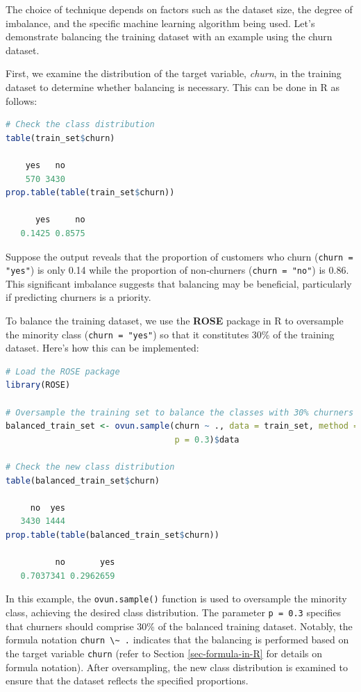 \documentclass[
]{book}
\newcommand{\passthrough}[1]{#1}
\theoremstyle{definition}
\theoremstyle{definition}
\theoremstyle{definition}
\theoremstyle{definition}
\theoremstyle{remark}
\begin{document}
The choice of technique depends on factors such as the dataset size, the degree of imbalance, and the specific machine learning algorithm being used. Let's demonstrate balancing the training dataset with an example using the churn dataset.

First, we examine the distribution of the target variable, \emph{churn}, in the training dataset to determine whether balancing is necessary. This can be done in R as follows:

\begin{lstlisting}[language=R]
# Check the class distribution
table(train_set$churn)
   
    yes   no 
    570 3430
prop.table(table(train_set$churn))
   
      yes     no 
   0.1425 0.8575
\end{lstlisting}

Suppose the output reveals that the proportion of customers who churn (\passthrough{\lstinline!churn = "yes"!}) is only 0.14 while the proportion of non-churners (\passthrough{\lstinline!churn = "no"!}) is 0.86. This significant imbalance suggests that balancing may be beneficial, particularly if predicting churners is a priority.

To balance the training dataset, we use the \textbf{ROSE} package in R to oversample the minority class (\passthrough{\lstinline!churn = "yes"!}) so that it constitutes 30\% of the training dataset. Here's how this can be implemented:

\begin{lstlisting}[language=R]
# Load the ROSE package
library(ROSE)

# Oversample the training set to balance the classes with 30% churners
balanced_train_set <- ovun.sample(churn ~ ., data = train_set, method = "over", 
                                  p = 0.3)$data

# Check the new class distribution
table(balanced_train_set$churn)
   
     no  yes 
   3430 1444
prop.table(table(balanced_train_set$churn))
   
          no       yes 
   0.7037341 0.2962659
\end{lstlisting}

In this example, the \passthrough{\lstinline!ovun.sample()!} function is used to oversample the minority class, achieving the desired class distribution. The parameter \passthrough{\lstinline!p = 0.3!} specifies that churners should comprise 30\% of the balanced training dataset. Notably, the formula notation \passthrough{\lstinline!churn \~ .!} indicates that the balancing is performed based on the target variable \passthrough{\lstinline!churn!} (refer to Section \ref{sec-formula-in-R} for details on formula notation). After oversampling, the new class distribution is examined to ensure that the dataset reflects the specified proportions.
\end{document}
